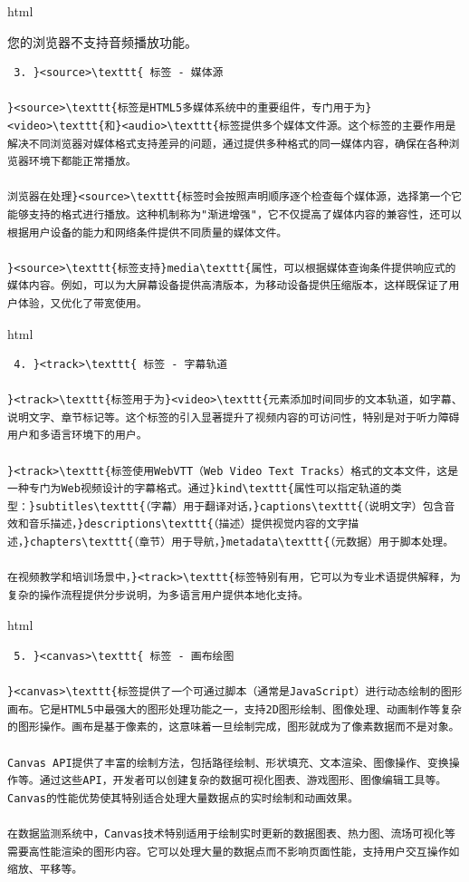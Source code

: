 html

您的浏览器不支持音频播放功能。

\begin{lstlisting}
 3. }<source>\texttt{ 标签 - 媒体源

}<source>\texttt{标签是HTML5多媒体系统中的重要组件，专门用于为}<video>\texttt{和}<audio>\texttt{标签提供多个媒体文件源。这个标签的主要作用是解决不同浏览器对媒体格式支持差异的问题，通过提供多种格式的同一媒体内容，确保在各种浏览器环境下都能正常播放。

浏览器在处理}<source>\texttt{标签时会按照声明顺序逐个检查每个媒体源，选择第一个它能够支持的格式进行播放。这种机制称为"渐进增强"，它不仅提高了媒体内容的兼容性，还可以根据用户设备的能力和网络条件提供不同质量的媒体文件。

}<source>\texttt{标签支持}media\texttt{属性，可以根据媒体查询条件提供响应式的媒体内容。例如，可以为大屏幕设备提供高清版本，为移动设备提供压缩版本，这样既保证了用户体验，又优化了带宽使用。
\end{lstlisting}

html

\begin{lstlisting}
 4. }<track>\texttt{ 标签 - 字幕轨道

}<track>\texttt{标签用于为}<video>\texttt{元素添加时间同步的文本轨道，如字幕、说明文字、章节标记等。这个标签的引入显著提升了视频内容的可访问性，特别是对于听力障碍用户和多语言环境下的用户。

}<track>\texttt{标签使用WebVTT（Web Video Text Tracks）格式的文本文件，这是一种专门为Web视频设计的字幕格式。通过}kind\texttt{属性可以指定轨道的类型：}subtitles\texttt{（字幕）用于翻译对话，}captions\texttt{（说明文字）包含音效和音乐描述，}descriptions\texttt{（描述）提供视觉内容的文字描述，}chapters\texttt{（章节）用于导航，}metadata\texttt{（元数据）用于脚本处理。

在视频教学和培训场景中，}<track>\texttt{标签特别有用，它可以为专业术语提供解释，为复杂的操作流程提供分步说明，为多语言用户提供本地化支持。
\end{lstlisting}

html

\begin{lstlisting}
 5. }<canvas>\texttt{ 标签 - 画布绘图

}<canvas>\texttt{标签提供了一个可通过脚本（通常是JavaScript）进行动态绘制的图形画布。它是HTML5中最强大的图形处理功能之一，支持2D图形绘制、图像处理、动画制作等复杂的图形操作。画布是基于像素的，这意味着一旦绘制完成，图形就成为了像素数据而不是对象。

Canvas API提供了丰富的绘制方法，包括路径绘制、形状填充、文本渲染、图像操作、变换操作等。通过这些API，开发者可以创建复杂的数据可视化图表、游戏图形、图像编辑工具等。Canvas的性能优势使其特别适合处理大量数据点的实时绘制和动画效果。

在数据监测系统中，Canvas技术特别适用于绘制实时更新的数据图表、热力图、流场可视化等需要高性能渲染的图形内容。它可以处理大量的数据点而不影响页面性能，支持用户交互操作如缩放、平移等。
\end{lstlisting}

